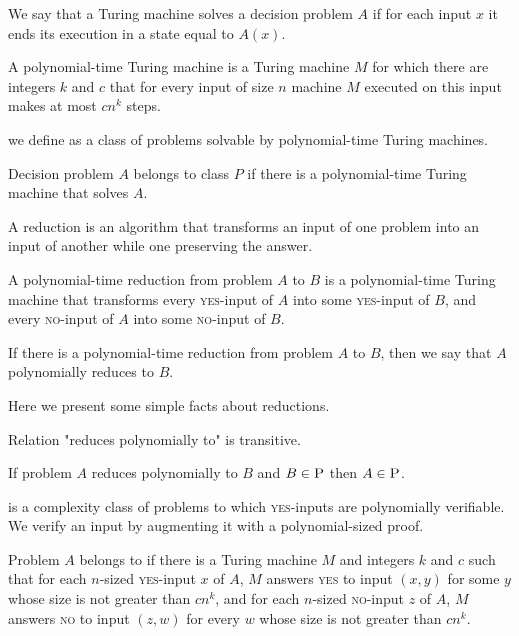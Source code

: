 \begin{defn}
We say that a Turing machine solves a decision problem $A$ if for each input $x$
it ends its execution in a state equal to $A(x)$.
\end{defn}

\begin{defn}
A polynomial-time Turing machine is a Turing machine $M$ for which there are integers $k$ and $c$
that for every input of size $n$ machine $M$ executed on this input makes at most $c n^k$ steps.
\end{defn}

we define \p as a class of problems solvable by polynomial-time Turing machines.

\begin{defn}[class \p]
Decision problem $A$ belongs to class $P$ if there is a polynomial-time Turing machine that solves $A$.
\end{defn}

A reduction is an algorithm that transforms an input of one problem
into an input of another while one preserving the answer.

\begin{defn}
A polynomial-time reduction from problem $A$ to $B$ is a polynomial-time Turing machine
that transforms every \textsc{yes}-input of $A$ into some \textsc{yes}-input of $B$,
and every \textsc{no}-input of $A$ into some \textsc{no}-input of $B$.
\end{defn}

If there is a polynomial-time reduction from problem $A$ to $B$,
then we say that $A$ polynomially reduces to $B$.

Here we present some simple facts about reductions.

\begin{rmrk}\label{tran-red}
Relation "reduces polynomially to" is transitive.
\end{rmrk}

\begin{rmrk}\label{p-red}
If problem $A$ reduces polynomially to $B$ and $B \in \text{\textsc{P}}$ then $A \in \text{\textsc{P}}$.
\end{rmrk}

\np is a complexity class of problems to which \textsc{yes}-inputs are polynomially verifiable.
We verify an input by augmenting it with a polynomial-sized proof.

\begin{defn}[\np]
Problem $A$ belongs to \np if there is a Turing machine $M$ and integers $k$ and $c$ such that
for each $n$-sized \textsc{yes}-input $x$ of $A$,
$M$ answers \textsc{yes} to input $(x,y)$ for some $y$ whose size is not greater than $c n^k$,
and for each $n$-sized \textsc{no}-input $z$ of $A$,
$M$ answers \textsc{no} to input $(z,w)$ for every $w$ whose size is not greater than $c n^k$.
\end{defn}

